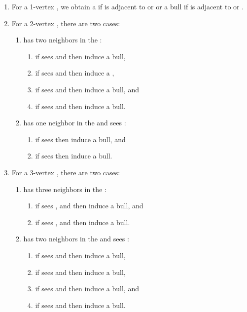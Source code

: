\documentclass[11pt]{article}
\newcommand{\0}{\text{ has a co-join to }}
\newcommand{\1}{\text{ has a join to }}
\begin{document}
\begin{enumerate}
\item For a 1-vertex , we obtain a  if  is adjacent to  or  or a bull if  is adjacent to  or . 

\item For a 2-vertex , there are two cases: 

\begin{enumerate}
\item  has two neighbors in the :  
\begin{enumerate}
\item if  sees  and  then  induce a bull, 
\item if  sees  and  then  induce a ,      
\item if  sees  and  then  induce a bull, and
\item if  sees  and  then  induce a bull. 
\end{enumerate}

\item  has one neighbor in the  and sees :
\begin{enumerate}
\item if  sees  then  induce a bull, and 
\item if  sees  then  induce a bull.      
\end{enumerate}
\end{enumerate}

\item For a 3-vertex , there are two cases: 

\begin{enumerate}
\item  has three neighbors in the :  
\begin{enumerate}
\item if  sees ,  and  then  induce a bull, and 
\item if  sees ,  and  then  induce a bull.      
\end{enumerate}

\item  has two neighbors in the  and sees :
\begin{enumerate}
\item if  sees  and  then  induce a bull, 
\item if  sees  and  then  induce a bull,      
\item if  sees  and  then  induce a bull, and 
\item if  sees  and  then  induce a bull.          
\end{enumerate}
\end{enumerate}


\end{enumerate}
\end{document}
